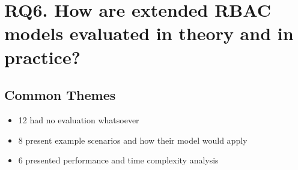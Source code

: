\documentclass[letterpaper,10pt,english]{sphinxmanual}
\begin{document}
\chapter{RQ6. How are extended RBAC models evaluated in theory and in practice?}
\label{research_questions/RQ_6:rq6-how-are-extended-rbac-models-evaluated-in-theory-and-in-practice}\label{research_questions/RQ_6::doc}

\section{Common Themes}
\label{research_questions/RQ_6:common-themes}\begin{itemize}
\item {} 
12 had no evaluation whatsoever

\item {} 
8 present example scenarios and how their model would apply

\item {} 
6 presented performance and time complexity analysis

\end{itemize}
\end{document}
